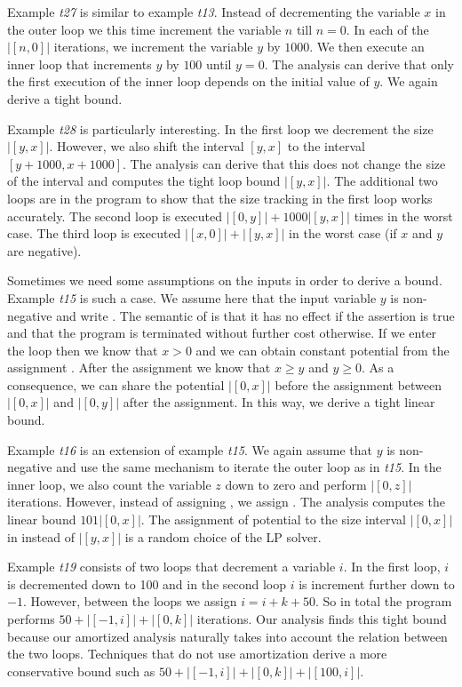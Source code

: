 \documentclass[nocopyrightspace,preprint,pldi]{sigplanconf-pldi15}
\begin{document}
{Example \emph{t27} is similar to example \emph{t13}.  Instead of
decrementing the variable $x$ in the outer loop we this time increment
the variable $n$ till $n = 0$.  In each of the $|[n,0]|$ iterations,
we increment the variable $y$ by $1000$.  We then execute an inner
loop that increments $y$ by $100$ until $y=0$.  The analysis can
derive that only the first execution of the inner loop depends on the
initial value of $y$.  We again derive a tight bound.

Example \emph{t28} is particularly interesting.  In the first loop we
decrement the size $|[y,x]|$.  However, we also shift the interval
$[y,x]$ to the interval $[y+1000,x+1000]$.  The analysis can derive
that this does not change the size of the interval and computes the
tight loop bound $|[y,x]|$.  The additional two loops are in the
program to show that the size tracking in the first loop works
accurately.  The second loop is executed $|[0,y]| + 1000|[y,x]|$ times
in the worst case.  The third loop is executed $|[x,0]| + |[y,x]|$ in
the worst case (if $x$ and $y$ are negative).

Sometimes we need some assumptions on the inputs in order to derive a
bound.  Example \emph{t15} is such a case.  We assume here that the
input variable $y$ is non-negative and write .  The
semantic of  is that it has no effect if the assertion is
true and that the program is terminated without further cost
otherwise.  If we enter the loop then we know that $x>0$ and we can
obtain constant potential from the assignment .  After the
assignment we know that $x\geq y$ and $y\geq 0$.  As a consequence, we
can share the potential $|[0,x]|$ before the assignment 
between $|[0,x]|$ and $|[0,y]|$ after the assignment.  In this way, we
derive a tight linear bound.

Example \emph{t16} is an extension of example \emph{t15}. We again
assume that $y$ is non-negative and use the same mechanism to iterate
the outer loop as in \emph{t15}.  In the inner loop, we also count the
variable $z$ down to zero and perform $|[0,z]|$ iterations.  However,
instead of assigning , we assign .  The analysis
computes the linear bound $101|[0,x]|$.  The
assignment of potential to the size interval $|[0,x]|$ in instead of
$|[y,x]|$ is a random choice of the LP solver.

Example \emph{t19} consists of two loops that decrement a variable
$i$.  In the first loop, $i$ is decremented down to 100 and in the
second loop $i$ is increment further down to $-1$.  However, between
the loops we assign $i=i+k+50$.  So in total the program performs $50
+ |[-1,i]| + |[0,k]|$ iterations.  Our analysis finds this tight bound
because our amortized analysis naturally takes into account the
relation between the two loops.  Techniques that do not use
amortization derive a more conservative bound such as $50 + |[-1,i]| +
|[0,k]| + |[100,i]|$.

}
\end{document}
